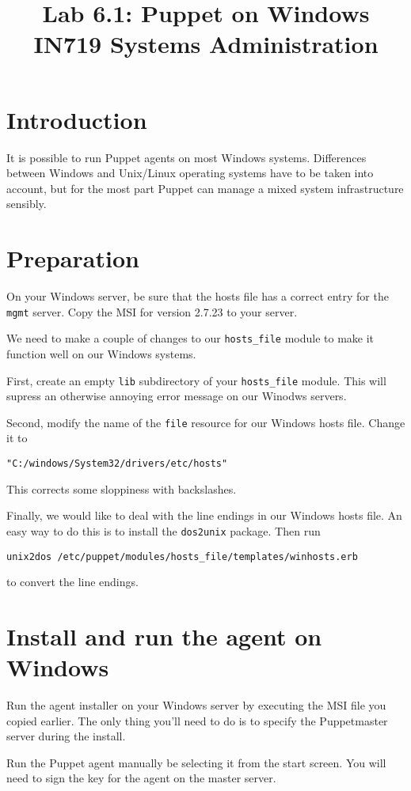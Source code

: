 \documentclass{article}   	%
\title{Lab 6.1:  Puppet on Windows\\ IN719 Systems Administration}
\date{}							%
\begin{document}
\maketitle

\section*{Introduction}
It is possible to run Puppet agents on most Windows systems.  Differences between Windows and Unix/Linux operating systems have to be taken into account, but for the most part Puppet can manage a mixed system infrastructure sensibly.

\section{Preparation}
On your Windows server, be sure that the hosts file has a correct entry for the \texttt{mgmt} server.  Copy the MSI for version 2.7.23 to your server.

We need to make a couple of changes to our \texttt{hosts\_file} module to make it function well on our Windows systems.

First, create an empty \texttt{lib} subdirectory of your \texttt{hosts\_file} module.  This will supress an otherwise annoying error message on our Winodws servers.

Second, modify the name of the \texttt{file} resource for our Windows hosts file.  Change it to 

\texttt{"C:/windows/System32/drivers/etc/hosts"}

This corrects some sloppiness with backslashes.

Finally, we would like to deal with the line endings in our Windows hosts file.  An easy way to do this is to install the \texttt{dos2unix} package.  Then run

\texttt{unix2dos /etc/puppet/modules/hosts\_file/templates/winhosts.erb}

to convert the line endings.

\section{Install and run the agent on Windows}
Run the agent installer on your Windows server by executing the MSI file you copied earlier.  The only thing you'll need to do is to specify the Puppetmaster server during the install.

Run the Puppet agent manually be selecting it from the start screen. You will need to sign the key for the agent on the master server.
\end{document}
